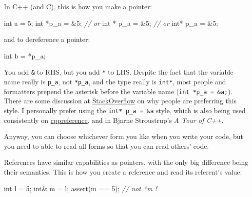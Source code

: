 \documentclass[
]{book}
\newenvironment{Shaded}{\begin{snugshade}}{\end{snugshade}}
\newcommand{\CommentTok}[1]{\textcolor[rgb]{0.56,0.35,0.01}{\textit{#1}}}
\newcommand{\DataTypeTok}[1]{\textcolor[rgb]{0.13,0.29,0.53}{#1}}
\newcommand{\DecValTok}[1]{\textcolor[rgb]{0.00,0.00,0.81}{#1}}
\newcommand{\NormalTok}[1]{#1}
\newcommand{\OtherTok}[1]{\textcolor[rgb]{0.56,0.35,0.01}{#1}}
\begin{document}
In C++ (and C), this is how you make a pointer:

\begin{Shaded}
\begin{Highlighting}[]
\DataTypeTok{int}\NormalTok{    a =  }\DecValTok{5}\NormalTok{;}
\DataTypeTok{int}\NormalTok{ *p\_a = \&}\DecValTok{5}\NormalTok{;}
\CommentTok{// or}
\DataTypeTok{int}\NormalTok{ * p\_a = \&}\DecValTok{5}\NormalTok{;}
\CommentTok{// or}
\DataTypeTok{int}\NormalTok{*  p\_a = \&}\DecValTok{5}\NormalTok{;}
\end{Highlighting}
\end{Shaded}

and to dereference a pointer:

\begin{Shaded}
\begin{Highlighting}[]
\DataTypeTok{int}\NormalTok{ b = *p\_a;}
\end{Highlighting}
\end{Shaded}

You add \texttt{\&} to RHS, but you add \texttt{*} to LHS. Despite the fact that the variable name really is \texttt{p\_a}, not \texttt{*p\_a}, and the type really is \texttt{int*}, most people and formatters prepend the asterisk before the variable name (\texttt{int\ *p\_a\ =\ \&a;}). There are some discussion at \href{https://stackoverflow.com/questions/398395/why-is-the-asterisk-before-the-variable-name-rather-than-after-the-type}{StackOverflow} on why people are preferring this style. I personally prefer using the \texttt{int*\ p\_a\ =\ \&a} style, which is also being used consistently on \href{https://en.cppreference.com/w/cpp/language/pointer}{cppreference}, and in Bjarne Stroustrup's \emph{A Tour of C++}.

Anyway, you can choose whichever form you like when you write your code, but you need to able to read all forms so that you can read others' code.

References have similar capabilities as pointers, with the only big difference being their semantics.
This is how you create a reference and read its referent's value:

\begin{Shaded}
\begin{Highlighting}[]
\DataTypeTok{int}\NormalTok{ l = }\DecValTok{5}\NormalTok{;}
\DataTypeTok{int}\NormalTok{\& m = l;}
\OtherTok{assert}\NormalTok{(m == }\DecValTok{5}\NormalTok{); }\CommentTok{// not \textasciigrave{}*m\textasciigrave{} !}
\end{Highlighting}
\end{Shaded}
\end{document}
